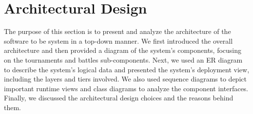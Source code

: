 \section{Architectural Design}

The purpose of this section is to present and analyze the architecture of the software to be system in a top-down manner. We first introduced the overall architecture and then provided a diagram of the system’s components, focusing on the tournaments and battles sub-components. Next, we used an ER diagram to describe the system’s logical data and presented the system’s deployment view, including the layers and tiers involved. We also used sequence diagrams to depict important runtime views and class diagrams to analyze the component interfaces. Finally, we discussed the architectural design choices and the reasons behind them.

